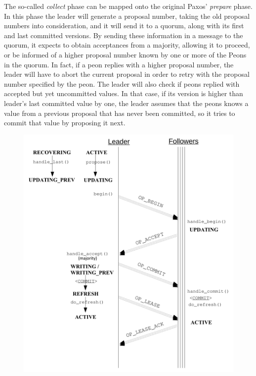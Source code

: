 \documentclass{article}
\begin{document}
The so-called \textit{collect} phase can be mapped onto the original Paxos' \textit{prepare} phase.
In this phase the leader will generate a proposal number, taking the old proposal numbers into consideration, 
and it will send it to a quorum, along with its first and last committed versions.
By sending these information in a message to the quorum, it expects to
obtain acceptances from a majority, allowing it to proceed, 
or be informed of a higher proposal number known by one or more of the Peons in the quorum.
In fact, if a peon replies with a higher proposal number, the leader will have to abort the current
proposal in order to retry with the proposal number specified by the peon.
The leader will also check if peons replied with accepted but
yet uncommitted values. In that case, if its version is higher than leader's
last committed value by one, the leader assumes that the peons knows a value from a
previous proposal that has never been committed, so it tries to commit that value by proposing it next.

\begin{figure}[!h]
    \centering
	\includegraphics[scale=0.50]{figs/paxos_seq.pdf}
	\label{fig:paxosseq}
\end{figure}
\FloatBarrier
\end{document}
